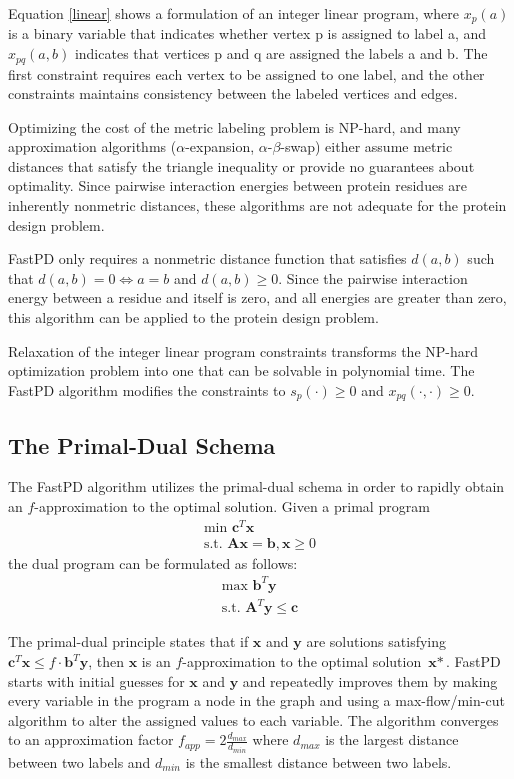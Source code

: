 \documentclass[11pt]{article}
\begin{document}
	Equation \ref{linear} shows a formulation of an integer linear program, where
	$x_p(a)$ is a binary variable that indicates whether vertex p is assigned to
	label a, and $x_{pq}(a,b)$ indicates that vertices p and q are assigned the
	labels a and b.  The first constraint requires each vertex to be assigned to
	one label, and the other constraints maintains consistency between the labeled
	vertices and edges.
	
	Optimizing the cost of the metric labeling problem is NP-hard, and many
	approximation algorithms ($\alpha$-expansion, $\alpha$-$\beta$-swap) either
	assume metric distances that satisfy the triangle inequality or provide no
	guarantees about optimality.  Since pairwise interaction energies between
	protein residues are inherently nonmetric distances, these algorithms are not
	adequate for the protein design problem.  
	
	FastPD only requires a nonmetric distance function that satisfies $d(a,b)$ such
	that $d(a,b)=0 \iff a=b$ and $d(a,b) \geq 0$.  Since the pairwise interaction
	energy between a residue and itself is zero, and all energies are greater than
	zero, this algorithm can be applied to the protein design problem.  
	
	Relaxation of the integer linear program constraints transforms the NP-hard
	optimization problem into one that can be solvable in polynomial time.  The 
	FastPD algorithm modifies the constraints to 
	$s_p(\cdot) \ge 0$ and $x_{pq}(\cdot, \cdot) \ge 0$.  

	\subsection{The Primal-Dual Schema}	
	
	The FastPD algorithm utilizes the primal-dual schema in order to rapidly obtain
	an $f$-approximation to the optimal solution. Given a primal program
	\begin{gather*}
	\text{min }\textbf{c}^T\textbf{x} \\
	\text{s.t. }\textbf{Ax} = \textbf{b}, \textbf{x} \geq 0
	\end{gather*}
	the dual program can be formulated as follows:
	\begin{gather*}
	\text{max } \textbf{b}^T\textbf{y} \\
	\text{s.t. }\textbf{A}^T\textbf{y} \leq \textbf{c} 
	\end{gather*}		

	The primal-dual principle states that if $\textbf{x}$ and $\textbf{y}$ are
	solutions satisfying $\textbf{c}^T\textbf{x} \leq f \cdot \textbf{b}^T\textbf{y}$,
	then $\textbf{x}$ is an $f$-approximation to the optimal solution $\textbf{x}*$.
	FastPD starts with initial guesses for $\textbf{x}$ and $\textbf{y}$ and 
	repeatedly improves them by making every variable in the program a node in the
	graph and using a max-flow/min-cut algorithm to alter the assigned values to
	each variable. The algorithm converges to an approximation factor
	$f_{app} = 2 \frac{d_{max}}{d_{min}}$ where $d_{max}$ is the largest distance
	between two labels and $d_{min}$ is the smallest distance between two labels. 
	
\end{document}
